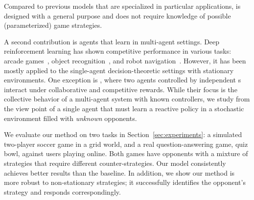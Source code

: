 Compared to previous models
that are specialized in particular applications, \dron{} is designed with a
general purpose and does not require knowledge of possible (parameterized)
game strategies.

A second contribution is \dqn{} agents that learn in multi-agent settings. Deep
reinforcement learning has shown competitive performance in various tasks:
arcade games~\cite{mnih-dqn-2015}, object
recognition~\cite{mnih14visualattention}, and robot
navigation~\cite{zhang15dnnmemory}.  However, it has been mostly applied to the
single-agent decision-theoretic settings with stationary environments.  One
exception is \citet{multiagent-dqn}, where two agents controlled by independent
\dqn{}s interact under collaborative and competitive rewards.  While their focus
is the collective behavior of a multi-agent system with known controllers, we
study from the view point of a single agent that must learn a reactive
policy in a stochastic environment filled with \emph{unknown}
opponents.


We evaluate our method on two tasks in Section~\ref{sec:experiments}: a
simulated two-player soccer game in a grid world, and a real question-answering
game, quiz bowl, against users playing online.  Both games have opponents with a mixture of
strategies that require different counter-strategies.  Our model consistently
achieves better results than the \dqn{} baseline.  In addition, we show our
method is more robust to non-stationary strategies; it successfully identifies
the opponent's strategy and responds correspondingly.
